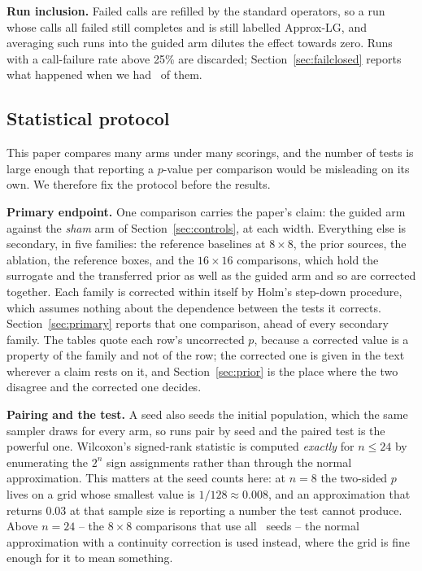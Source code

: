 \documentclass[acmsmall,review,anonymous]{acmart}
\begin{document}
\textbf{Run inclusion.}  Failed calls are refilled by the standard
operators, so a run whose calls all failed still completes and is still
labelled Approx-LG, and averaging such runs into the guided arm dilutes the
effect towards zero.  Runs with a call-failure rate above 25\% are discarded;
Section~\ref{sec:failclosed} reports what happened when we had \DeadRuns\ of them.

\subsection{Statistical protocol}
\label{sec:stats}
This paper compares many arms under many scorings, and the number of tests is
large enough that reporting a $p$-value per comparison would be misleading on
its own.  We therefore fix the protocol before the results.

\textbf{Primary endpoint.}  One comparison carries the paper's claim: the
guided arm against the \emph{sham} arm of Section~\ref{sec:controls}, at each
width.  Everything else is secondary, in five families: the reference baselines
at $8\times8$, the prior sources, the ablation, the reference boxes, and the
$16\times16$ comparisons, which hold the surrogate and the transferred prior as
well as the guided arm and so are corrected together.  Each family is corrected
within itself by Holm's step-down procedure, which assumes nothing about the
dependence between the tests it corrects.
Section~\ref{sec:primary} reports that one comparison, ahead of every secondary
family.  The tables quote each row's uncorrected $p$, because a corrected value
is a property of the family and not of the row; the corrected one is given in
the text wherever a claim rests on it, and Section~\ref{sec:prior} is the place
where the two disagree and the corrected one decides.

\textbf{Pairing and the test.}  A seed also seeds the initial population, which
the same sampler draws for every arm, so runs pair by seed and the paired test
is the powerful one.  Wilcoxon's signed-rank statistic is computed
\emph{exactly} for $n\le24$ by enumerating the $2^n$ sign assignments rather
than through the normal approximation.  This matters at the seed counts here:
at $n=8$ the two-sided $p$ lives on a grid whose smallest value is $1/128
\approx 0.008$, and an approximation that returns $0.03$ at that sample size is
reporting a number the test cannot produce.  Above $n=24$ -- the $8\times8$
comparisons that use all \SeedsEight\ seeds -- the normal approximation with a
continuity correction is used instead, where the grid is fine enough for it to
mean something.
\end{document}
